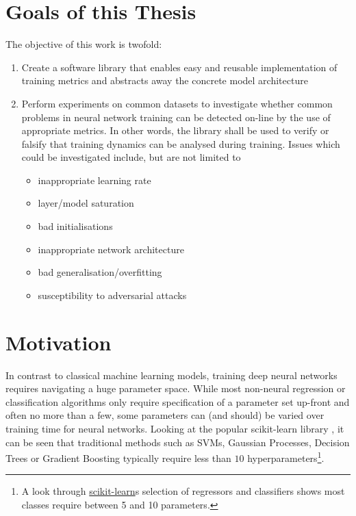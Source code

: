 \hypertarget{sec:thesis-goals}{%
\section{Goals of this Thesis}\label{sec:thesis-goals}}

The objective of this work is twofold:

\begin{enumerate}
    \item
        Create a software library that enables easy and reusable
        implementation of training metrics and abstracts away the concrete model
        architecture
    \item
        Perform experiments on common datasets to investigate whether common
        problems in neural network training can be detected on-line by the use of
        appropriate metrics. In other words, the library shall be used to
        verify or falsify that training dynamics can be analysed during
        training. Issues which could be investigated include, but are
        not limited to
        \begin{itemize}
            \item
                inappropriate learning rate
            \item
                layer/model saturation
            \item
                bad initialisations
            \item
                inappropriate network architecture
            \item
                bad generalisation/overfitting
            \item
                susceptibility to adversarial attacks
        \end{itemize}
\end{enumerate}

\hypertarget{sec:motivation}{%
\section{Motivation}\label{sec:motivation}}

In contrast to classical machine learning models, training deep neural networks
requires navigating a huge parameter space. While most non-neural regression or
classification algorithms only require specification of a parameter set up-front
and often no more than a few, some parameters can (and should) be varied over
training time for neural networks. Looking at the popular scikit-learn library \citep{scikit-learn},
it can be seen that traditional methods such as SVMs, Gaussian Processes,
Decision Trees or Gradient Boosting typically require less than $10$
hyperparameters\footnote{A look through
\href{http://scikit-learn.org/stable/supervised_learning.html\#supervised-learning}{scikit-learn}s
selection of regressors and classifiers shows most classes require between 5 and
10 parameters.}.

